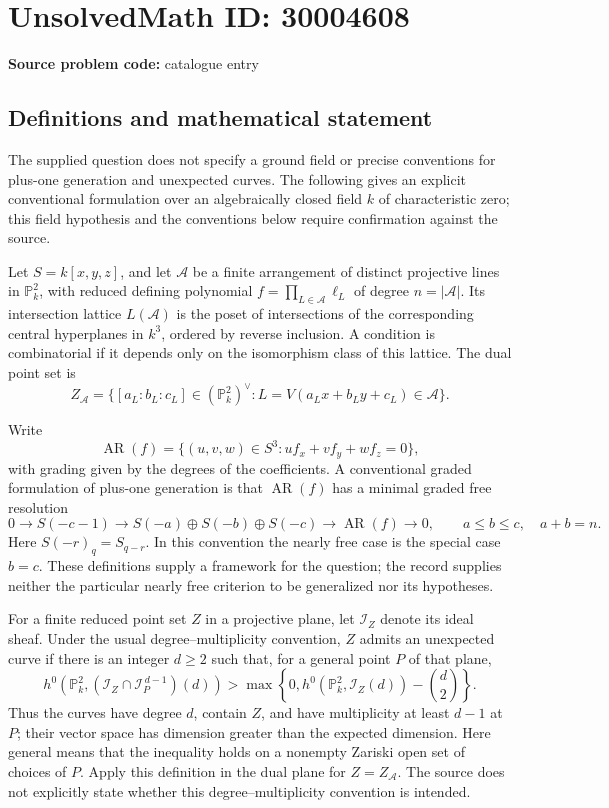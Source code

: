 \documentclass[11pt]{article}
\newcommand{\PP}{\mathbb{P}}
\begin{document}
\section*{UnsolvedMath ID: 30004608}
\textbf{Source problem code:} catalogue entry
\subsection{Definitions and mathematical statement}
The supplied question does not specify a ground field or precise conventions for plus-one generation and unexpected curves. The following gives an explicit conventional formulation over an algebraically closed field \(k\) of characteristic zero; this field hypothesis and the conventions below require confirmation against the source.

Let \(S=k[x,y,z]\), and let \(\mathcal A\) be a finite arrangement of distinct projective lines in \(\PP^2_k\), with reduced defining polynomial \(f=\prod_{L\in\mathcal A}\ell_L\) of degree \(n=|\mathcal A|\). Its intersection lattice \(L(\mathcal A)\) is the poset of intersections of the corresponding central hyperplanes in \(k^3\), ordered by reverse inclusion. A condition is combinatorial if it depends only on the isomorphism class of this lattice. The dual point set is
\[
Z_{\mathcal A}=\{[a_L:b_L:c_L]\in(\PP^2_k)^\vee : L=V(a_Lx+b_Ly+c_L)\in\mathcal A\}.
\]

Write
\[
\operatorname{AR}(f)=\{(u,v,w)\in S^3:u f_x+v f_y+w f_z=0\},
\]
with grading given by the degrees of the coefficients. A conventional graded formulation of plus-one generation is that \(\operatorname{AR}(f)\) has a minimal graded free resolution
\[
0\longrightarrow S(-c-1)\longrightarrow
S(-a)\oplus S(-b)\oplus S(-c)
\longrightarrow\operatorname{AR}(f)\longrightarrow0,
\qquad a\le b\le c,\quad a+b=n.
\]
Here \(S(-r)_q=S_{q-r}\). In this convention the nearly free case is the special case \(b=c\). These definitions supply a framework for the question; the record supplies neither the particular nearly free criterion to be generalized nor its hypotheses.

For a finite reduced point set \(Z\) in a projective plane, let \(\mathcal I_Z\) denote its ideal sheaf. Under the usual degree--multiplicity convention, \(Z\) admits an unexpected curve if there is an integer \(d\ge2\) such that, for a general point \(P\) of that plane,
\[
 h^0\!\left(\PP^2_k,
 (\mathcal I_Z\cap\mathcal I_P^{\,d-1})(d)\right)
 >\max\!\left\{0,
 h^0\!\left(\PP^2_k,\mathcal I_Z(d)\right)
 -\binom{d}{2}\right\}.
\]
Thus the curves have degree \(d\), contain \(Z\), and have multiplicity at least \(d-1\) at \(P\); their vector space has dimension greater than the expected dimension. Here general means that the inequality holds on a nonempty Zariski open set of choices of \(P\). Apply this definition in the dual plane for \(Z=Z_{\mathcal A}\). The source does not explicitly state whether this degree--multiplicity convention is intended.
\end{document}
